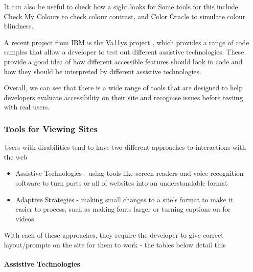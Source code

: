 \documentclass[ %
                    author={Aleena Baig},
                supervisor={Dr Simon Lock},
                    degree={BSc},
                     title={On Making Web Accessible Graphs},
                  subtitle={},
                      year={2019} ]{dissertation}
\begin{document}
It can also be useful to check how a sight looks for Some tools for this include Check My Colours \cite{colourchecker} to check colour contrast, and Color Oracle \cite{colororacle} to simulate colour blindness.

A recent project from IBM is the Va11ys project \cite{va11ys}, which provides a range of code samples that allow a developer to test out different assistive technologies. These provide a good idea of how different accessible features should look in code and how they should be interpreted by different assistive technologies.

Overall, we can see that there is a wide range of tools that are designed to help developers evaluate accessibility on their site and recognise issues before testing with real users.


\subsubsection{Tools for Viewing Sites}

Users with disabilities tend to have two different approaches to interactions with the web

\begin{itemize}
    \item Assistive Technologies - using tools like screen readers and voice recognition software to turn parts or all of websites into an understandable format
    \item Adaptive Strategies - making small changes to a site's format to make it easier to process, such as making fonts larger or turning captions on for videos
\end{itemize}

With each of these approaches, they require the developer to give correct layout/prompts on the site for them to work - the tables below detail this

\paragraph{Assistive Technologies}
\end{document}
